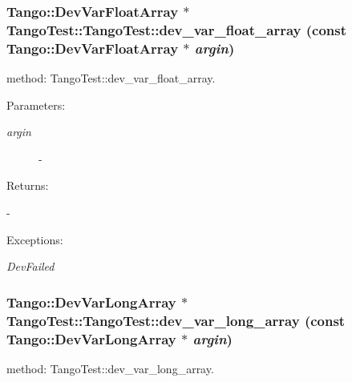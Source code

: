 \subsubsection{\setlength{\rightskip}{0pt plus 5cm}Tango::Dev\-Var\-Float\-Array $\ast$ Tango\-Test::Tango\-Test::dev\_\-var\_\-float\_\-array (const Tango::Dev\-Var\-Float\-Array $\ast$ {\em argin})}\label{classTangoTest_1_1TangoTest_z5_17}


method: Tango\-Test::dev\_\-var\_\-float\_\-array.

\begin{Desc}
\item[Parameters: ]\par
\begin{description}
\item[{\em 
argin}]- \end{description}
\end{Desc}
\begin{Desc}
\item[Returns: ]\par
- \end{Desc}
\begin{Desc}
\item[Exceptions: ]\par
\begin{description}
\item[{\em 
Dev\-Failed}] \end{description}
\end{Desc}
\subsubsection{\setlength{\rightskip}{0pt plus 5cm}Tango::Dev\-Var\-Long\-Array $\ast$ Tango\-Test::Tango\-Test::dev\_\-var\_\-long\_\-array (const Tango::Dev\-Var\-Long\-Array $\ast$ {\em argin})}\label{classTangoTest_1_1TangoTest_z5_15}


method: Tango\-Test::dev\_\-var\_\-long\_\-array.

